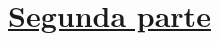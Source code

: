 \documentclass[a4paper]{article}
\begin{document}


\section{\underline{Segunda parte}}
\end{document}
